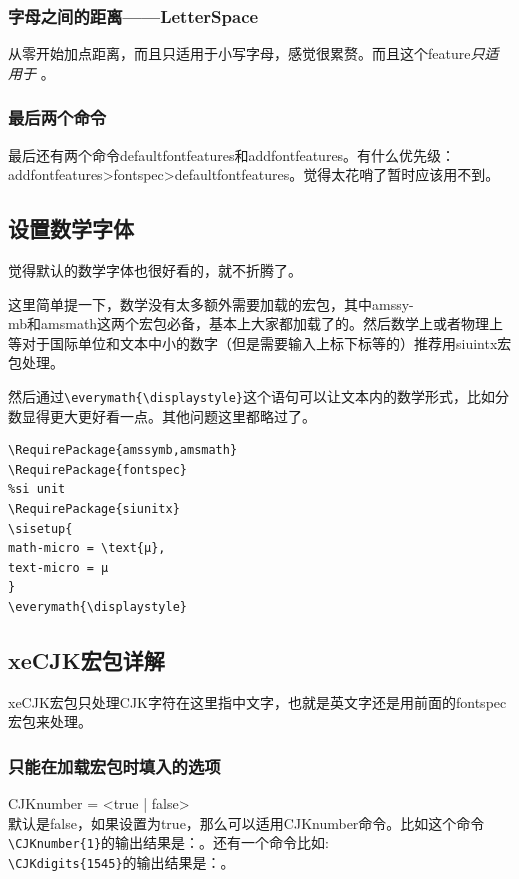 \documentclass[12pt,oneside]{book}
\begin{document}
\begin{common-format}
\subsubsection{字母之间的距离——LetterSpace}
从零开始加点距离，而且只适用于小写字母，感觉很累赘。而且这个feature\emph{只适用于\XeTeX} 。


\subsubsection{最后两个命令}
最后还有两个命令defaultfontfeatures和addfontfeatures。有什么优先级：\\ addfontfeatures>fontspec>defaultfontfeatures。觉得太花哨了暂时应该用不到。




\subsection{设置数学字体}
觉得默认的数学字体也很好看的，就不折腾了。

这里简单提一下，数学没有太多额外需要加载的宏包，其中amssy-\\mb和amsmath这两个宏包必备，基本上大家都加载了的。然后数学上或者物理上等对于国际单位和文本中小的数字（但是需要输入上标下标等的）推荐用siuintx宏包处理。

然后通过\verb+\everymath{\displaystyle}+这个语句可以让文本内的数学形式，比如分数显得更大更好看一点。其他问题这里都略过了。

\begin{Verbatim}
\RequirePackage{amssymb,amsmath}
\RequirePackage{fontspec}
%si unit
\RequirePackage{siunitx}
\sisetup{
math-micro = \text{μ},
text-micro = μ
}
\everymath{\displaystyle}
\end{Verbatim}



\subsection{xeCJK宏包详解}
xeCJK宏包只处理CJK字符在这里指中文字，也就是英文字还是用前面的fontspec宏包来处理。

\subsubsection{只能在加载宏包时填入的选项}
CJKnumber = <true | false> \\
默认是false，如果设置为true，那么可以适用CJKnumber命令。比如这个命令\verb+\CJKnumber{1}+的输出结果是：。还有一个命令比如:\\
\verb+\CJKdigits{1545}+的输出结果是：。


\end{common-format}
\end{document}

